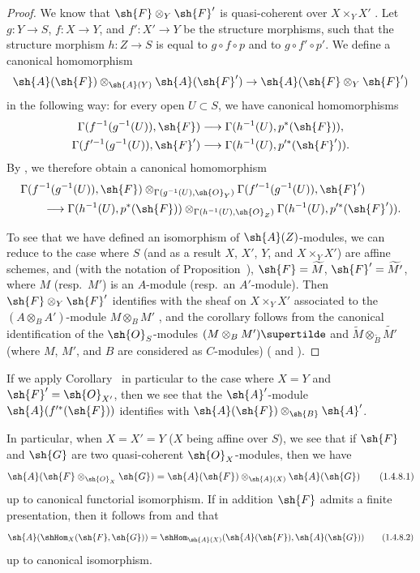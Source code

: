 \begin{proof}
We know that $\sh{F}\otimes_Y\sh{F}'$ is quasi-coherent over $X\times_Y X'$ .
Let $g:Y\to S$, $f:X\to Y$, and $f':X'\to Y$ be the structure morphisms, such that the structure morphism
$h:Z\to S$ is equal to $g\circ f\circ p$ and to $g\circ f'\circ p'$.
We define a canonical homomorphism
\[
  \sh{A}(\sh{F})\otimes_{\sh{A}(Y)}\sh{A}(\sh{F}')\to\sh{A}(\sh{F}\otimes_Y\sh{F}')
\]
in the following way: for every open $U\subset S$, we have canonical homomorphisms
\[
  \begin{aligned}
  \Gamma(f^{-1}(g^{-1}(U)),\sh{F})
  &\longrightarrow\Gamma(h^{-1}(U),p^*(\sh{F})),\\
  \Gamma(f^{\prime-1}(g^{-1}(U)),\sh{F}')
  &\longrightarrow\Gamma(h^{-1}(U),p^{\prime*}(\sh{F}')).
  \end{aligned}
\]
By , we therefore obtain a canonical homomorphism
\[
  \begin{aligned}
  &\Gamma(f^{-1}(g^{-1}(U)),\sh{F})
    \otimes_{\Gamma(g^{-1}(U),\sh{O}_Y)}
    \Gamma(f^{\prime-1}(g^{-1}(U)),\sh{F}')\\
  &\qquad\longrightarrow
    \Gamma(h^{-1}(U),p^*(\sh{F}))
    \otimes_{\Gamma(h^{-1}(U),\sh{O}_Z)}
    \Gamma(h^{-1}(U),p^{\prime*}(\sh{F}')).
  \end{aligned}
\]

To see that we have defined an isomorphism of $\sh{A}(Z)$-modules, we can reduce to the case where $S$ (and as a result $X$, $X'$, $Y$, and $X\times_Y X'$) are affine schemes, and (with the notation of Proposition~), $\sh{F}=\widetilde{M}$, $\sh{F}'=\widetilde{M'}$, where $M$ (resp.~$M'$) is an $A$-module (resp.~an $A'$-module).
Then $\sh{F}\otimes_Y\sh{F}'$ identifies with the sheaf on $X\times_Y X'$ associated to the $(A\otimes_B A')$-module $M\otimes_B M'$ , and the corollary follows from the canonical identification of the $\sh{O}_S$-modules $(M\otimes_B M')\supertilde$ and $\widetilde{M}\otimes_{\widetilde{B}}\widetilde{M'}$ (where $M$, $M'$, and $B$ are considered as $C$-modules) ( and ).
\end{proof}

If we apply Corollary~ in particular to the case where $X=Y$ and $\sh{F}'=\sh{O}_{X'}$, then we see that the $\sh{A}'$-module $\sh{A}(f^{\prime*}(\sh{F}))$ identifies with $\sh{A}(\sh{F})\otimes_\sh{B}\sh{A}'$.

\begin{env}[1.4.8]
\label{II.1.4.8}
In particular, when $X=X'=Y$ ($X$ being affine over $S$), we see that if $\sh{F}$ and $\sh{G}$ are two quasi-coherent $\sh{O}_X$-modules, then we have
\[
\label{II.1.4.8.1}
  \sh{A}(\sh{F}\otimes_{\sh{O}_X}\sh{G})=\sh{A}(\sh{F})\otimes_{\sh{A}(X)}\sh{A}(\sh{G})
  \tag{1.4.8.1}
\]
up to canonical functorial isomorphism.
If in addition $\sh{F}$ admits a finite presentation, then it follows from  and  that
\[
\label{II.1.4.8.2}
  \sh{A}(\shHom_X(\sh{F},\sh{G}))=\shHom_{\sh{A}(X)}(\sh{A}(\sh{F}),\sh{A}(\sh{G}))
  \tag{1.4.8.2}
\]
up to canonical isomorphism.
\end{env}

